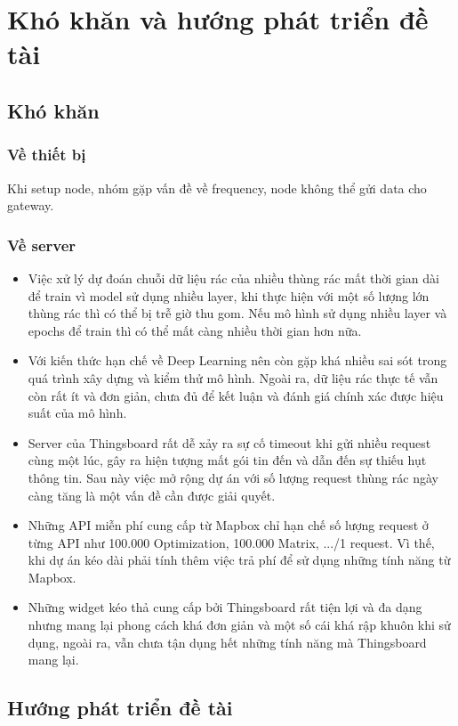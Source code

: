 

\chapter{Khó khăn và hướng phát triển đề tài}


\section{Khó khăn}
\subsection{Về thiết bị}
Khi setup node, nhóm gặp vấn đề về frequency, node không thể gửi data cho gateway.
\subsection{Về server}
\begin{itemize}
    \item Việc xử lý dự đoán chuỗi dữ liệu rác của nhiều thùng rác mất thời gian dài để train vì model sử dụng nhiều layer, khi thực hiện với một số lượng lớn thùng rác thì có thể bị trễ giờ thu gom. Nếu mô hình sử dụng nhiều layer và epochs để train thì có thể mất càng nhiều thời gian hơn nữa.
    \item Với kiến thức hạn chế về Deep Learning nên còn gặp khá nhiều sai sót trong quá trình xây dựng và kiểm thử mô hình. Ngoài ra, dữ liệu rác thực tế vẫn còn rất ít và đơn giản, chưa đủ để kết luận và đánh giá chính xác được hiệu suất của mô hình. 
    \item Server của Thingsboard rất dễ xảy ra sự cố timeout khi gửi nhiều request cùng một lúc, gây ra hiện tượng mất gói tin đến và dẫn đến sự thiếu hụt thông tin. Sau này việc mở rộng dự án với số lượng request thùng rác ngày càng tăng là một vấn đề cần được giải quyết.
    \item Những API miễn phí cung cấp từ Mapbox chỉ hạn chế số lượng request ở từng API như 100.000 Optimization, 100.000 Matrix, .../1 request. Vì thế, khi dự án kéo dài phải tính thêm việc trả phí để sử dụng những tính năng từ Mapbox.
    \item Những widget kéo thả cung cấp bởi Thingsboard rất tiện lợi và đa dạng nhưng mang lại phong cách khá đơn giản và một số cái khá rập khuôn khi sử dụng, ngoài ra, vẫn chưa tận dụng hết những tính năng mà Thingsboard mang lại.      
\end{itemize}

\section{Hướng phát triển đề tài}
